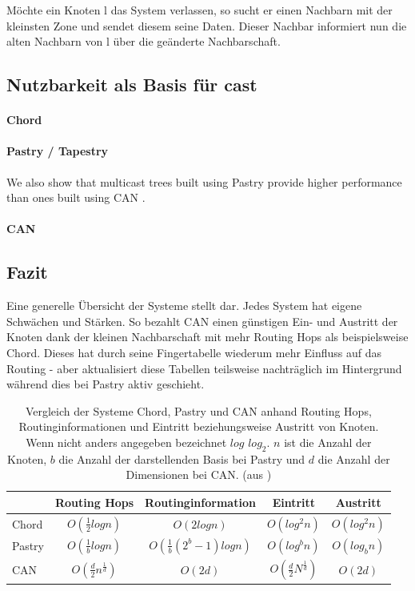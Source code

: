 Möchte ein Knoten l das System verlassen, so sucht er einen Nachbarn mit der kleinsten Zone und sendet diesem seine Daten. Dieser Nachbar informiert nun die alten Nachbarn von l über die geänderte Nachbarschaft.

\subsection{Nutzbarkeit als Basis für \ac{cast}}
\paragraph{Chord}

\paragraph{Pastry / Tapestry}
We also show that multicast trees built using Pastry provide higher performance than ones built using CAN \cite{Castro2003Evaluation, KostasKatrinis2005}.

\paragraph{CAN}
\cite{Ratnasamy2001}

\subsection{Fazit}
Eine generelle Übersicht der Systeme stellt  dar. Jedes System hat eigene Schwächen und Stärken. So bezahlt CAN einen günstigen Ein- und Austritt der Knoten dank der kleinen Nachbarschaft mit mehr Routing Hops als beispielsweise Chord. Dieses hat durch seine Fingertabelle wiederum mehr Einfluss auf das Routing - aber aktualisiert diese Tabellen teilsweise nachträglich im Hintergrund während dies bei Pastry aktiv geschieht.

\begin{table}[htbp]
\centering
\begin{tabular}{l|c|c|c|c}
 & Routing Hops & Routinginformation & Eintritt & Austritt\\ \hline  
Chord & $O(\frac{1}{2}log n)$ & $O(2log n) $ & $ O(log^2 n) $ & $ O(log^2 n) $ \\
Pastry & $O(\frac{1}{b}log n)$ & $O(\frac{1}{b} (2^b-1) log n) $ & $ O(log^b n) $ & $ O(log_b n) $ \\
CAN & $O(\frac{d}{2}n^\frac{1}{d})	$ & $O(2 d) $ & $ O(\frac{d}{2}N^\frac{1}{d}) $ & $ O(2 d) $
\label{tab:evaluation_p2p}
\end{tabular}
\caption{Vergleich der Systeme Chord, Pastry und CAN anhand Routing Hops, Routinginformationen und Eintritt beziehungsweise Austritt von Knoten. Wenn nicht anders angegeben bezeichnet $log$ $log_2$. $n$ ist die Anzahl der Knoten, $b$ die Anzahl der darstellenden Basis bei Pastry und $d$ die Anzahl der Dimensionen bei CAN. (aus \cite{Goetz2005})}
\label{tab:evaluation_fazit}
\end{table}


